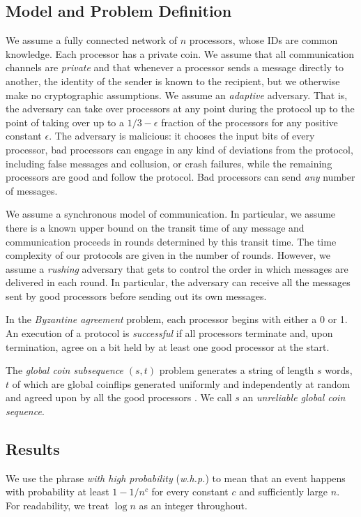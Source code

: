 \documentclass{sig-alternate}
\begin{document}
\subsection{Model and Problem Definition}
 We assume a fully connected network of $n$ processors, whose IDs are common knowledge.  Each processor has a private coin.  We assume that all communication channels are \emph{private} and that whenever a processor sends a message directly to another, the identity of the sender is known to the recipient, but we otherwise make no cryptographic assumptions.  We assume an {\it adaptive} adversary. That is, the adversary can take over processors at any point during the protocol up to the point of taking over up to a $1/3 - \epsilon$ fraction of the processors for any positive constant $\epsilon$.  The adversary is malicious: it  chooses the input bits of every processor,  bad processors can engage in any kind of deviations from the protocol, including false messages and collusion, or crash failures, while the remaining processors are good and follow the protocol. Bad processors can send {\it any} number of messages.

We assume a synchronous model of communication.  In particular, we assume there is a known upper bound on the transit time of any message and communication proceeds in rounds determined by this transit time.  The time complexity of our protocols are given in the number of rounds.  However, we assume a \emph{rushing} adversary that gets to control the order in which messages are delivered in each round.  In particular, the adversary can receive all the messages sent by good processors before sending out its own messages.

In the {\it  Byzantine agreement}  problem, each processor begins with either a 0 or 1. An execution of a protocol is {\it successful} if all processors  terminate and, upon termination, agree on a bit held by at least one good  processor at the start.  

The  {\it  global coin subsequence} $(s,t)$  problem  generates a string of length $s$ words, $t$ of  which are global coinflips generated uniformly and independently at random and agreed upon by all the good processors . We call $s$ an  {\it unreliable global coin sequence}.


\subsection{ Results}

We use the phrase {\it with high probability} ({\it w.h.p.}) to mean that an event happens with probability at least $1-1/n^c$
for every constant $c$ and sufficiently large $n$. For readability, we treat $\log n$ as an integer throughout. 
\end{document}
